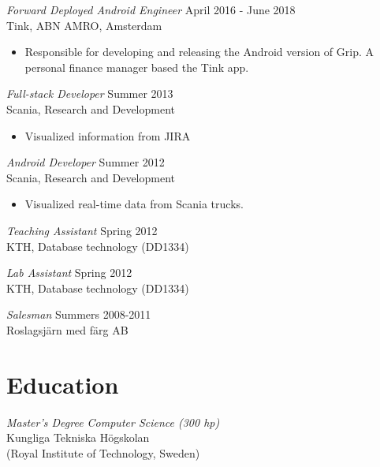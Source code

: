\documentclass[margin, 10pt]{res} %
\begin{document}
\begin{resume}
{\sl Forward Deployed Android Engineer} \hfill April 2016 - June 2018\\
Tink, ABN AMRO, Amsterdam
\begin{itemize} \itemsep -2pt %
\item Responsible for developing and releasing the Android version of Grip. A personal finance manager based the Tink app.
\end{itemize}

{\sl Full-stack Developer} \hfill Summer 2013 \\
Scania, Research and Development
\begin{itemize} \itemsep -2pt %
\item Visualized information from JIRA
\end{itemize}	
 
{\sl Android Developer} \hfill Summer 2012 \\
Scania, Research and Development
\begin{itemize} 
\item Visualized real-time data from Scania trucks.
\end{itemize} 

{\sl Teaching Assistant} \hfill Spring 2012 \\
KTH, Database technology (DD1334)

{\sl Lab Assistant} \hfill Spring 2012 \\
KTH, Database technology (DD1334)

{\sl Salesman} \hfill Summers 2008-2011 \\
Roslagsjärn med färg AB



\section{Education}

{\sl Master's Degree Computer Science (300 hp)} \\
Kungliga Tekniska Högskolan \\
(Royal Institute of Technology, Sweden)

 


\end{resume}
\end{document}
